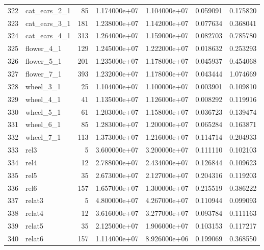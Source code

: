 \begin{tabular}{llrrrrr}
322 &             cat\_ears\_2\_1 &    85 &  1.174000e+07 &  1.104000e+07 &  0.059091 &   0.175820 \\
323 &             cat\_ears\_3\_1 &   181 &  1.238000e+07 &  1.142000e+07 &  0.077634 &   0.368041 \\
324 &             cat\_ears\_4\_1 &   313 &  1.264000e+07 &  1.159000e+07 &  0.082703 &   0.785780 \\
325 &               flower\_4\_1 &   129 &  1.245000e+07 &  1.222000e+07 &  0.018632 &   0.253293 \\
326 &               flower\_5\_1 &   201 &  1.235000e+07 &  1.178000e+07 &  0.045937 &   0.454068 \\
327 &               flower\_7\_1 &   393 &  1.232000e+07 &  1.178000e+07 &  0.043444 &   1.074669 \\
328 &                wheel\_3\_1 &    25 &  1.104000e+07 &  1.100000e+07 &  0.003901 &   0.109810 \\
329 &                wheel\_4\_1 &    41 &  1.135000e+07 &  1.126000e+07 &  0.008292 &   0.119916 \\
330 &                wheel\_5\_1 &    61 &  1.203000e+07 &  1.158000e+07 &  0.036723 &   0.139474 \\
331 &                wheel\_6\_1 &    85 &  1.283000e+07 &  1.200000e+07 &  0.065284 &   0.163871 \\
332 &                wheel\_7\_1 &   113 &  1.373000e+07 &  1.216000e+07 &  0.114714 &   0.204933 \\
333 &                     rel3 &     5 &  3.600000e+07 &  3.200000e+07 &  0.111110 &   0.102103 \\
334 &                     rel4 &    12 &  2.788000e+07 &  2.434000e+07 &  0.126844 &   0.109623 \\
335 &                     rel5 &    35 &  2.673000e+07 &  2.127000e+07 &  0.204316 &   0.119203 \\
336 &                     rel6 &   157 &  1.657000e+07 &  1.300000e+07 &  0.215519 &   0.386222 \\
337 &                   relat3 &     5 &  4.800000e+07 &  4.267000e+07 &  0.110944 &   0.099093 \\
338 &                   relat4 &    12 &  3.616000e+07 &  3.277000e+07 &  0.093784 &   0.111163 \\
339 &                   relat5 &    35 &  2.125000e+07 &  1.906000e+07 &  0.103153 &   0.117217 \\
340 &                   relat6 &   157 &  1.114000e+07 &  8.926000e+06 &  0.199069 &   0.368550 \\

\end{tabular}
